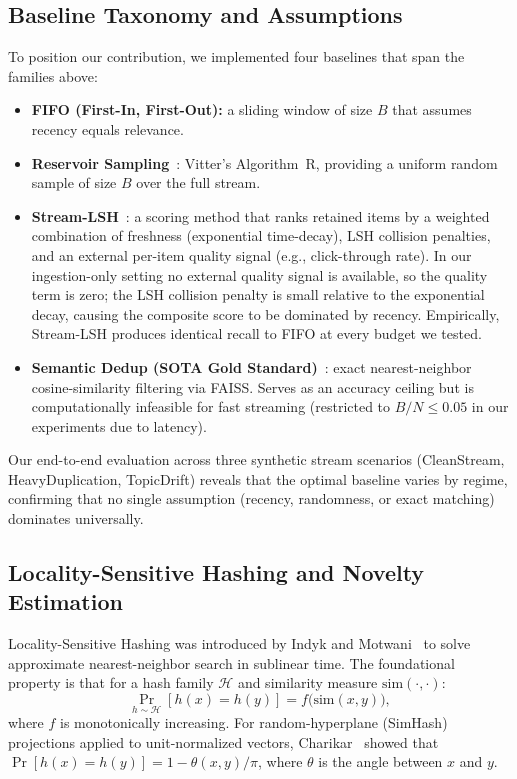 \documentclass[conference]{IEEEtran}
\begin{document}
\subsection{Baseline Taxonomy and Assumptions}
To position our contribution, we implemented four baselines that span the
families above:
\begin{itemize}
\item \textbf{FIFO (First-In, First-Out):} a sliding window of size $B$
      that assumes recency equals relevance.
\item \textbf{Reservoir Sampling}~\cite{b10}: Vitter's Algorithm~R,
      providing a uniform random sample of size $B$ over the full stream.
\item \textbf{Stream-LSH}~\cite{b12}: a scoring method that ranks
      retained items by a weighted combination of freshness (exponential
      time-decay), LSH collision penalties, and an external per-item
      quality signal (e.g., click-through rate). In our ingestion-only
      setting no external quality signal is available, so the quality
      term is zero; the LSH collision penalty is small relative to the
      exponential decay, causing the composite score to be dominated by
      recency. Empirically, Stream-LSH produces identical recall to
      FIFO at every budget we tested.
\item \textbf{Semantic Dedup (SOTA Gold Standard)}~\cite{b11}: exact
      nearest-neighbor cosine-similarity filtering via FAISS. Serves as
      an accuracy ceiling but is computationally infeasible for fast
      streaming (restricted to $B/N \le 0.05$ in our experiments due to
      latency).
\end{itemize}
Our end-to-end evaluation across three synthetic stream scenarios
(CleanStream, HeavyDuplication, TopicDrift) reveals that the optimal
baseline varies by regime, confirming that no single assumption
(recency, randomness, or exact matching) dominates universally.

\subsection{Locality-Sensitive Hashing and Novelty Estimation}
Locality-Sensitive Hashing was introduced by Indyk and
Motwani~\cite{b13} to solve approximate nearest-neighbor search in
sublinear time. The foundational property is that for a hash family
$\mathcal{H}$ and similarity measure $\mathrm{sim}(\cdot,\cdot)$:
\begin{equation}
\Pr_{h \sim \mathcal{H}}[h(x)=h(y)] = f\!\bigl(\mathrm{sim}(x,y)\bigr),
\label{eq:lsh-collision}
\end{equation}
where $f$ is monotonically increasing. For random-hyperplane (SimHash)
projections applied to unit-normalized vectors, Charikar~\cite{b14}
showed that $\Pr[h(x)=h(y)] = 1 - \theta(x,y)/\pi$, where $\theta$ is
the angle between $x$ and $y$.
\end{document}
